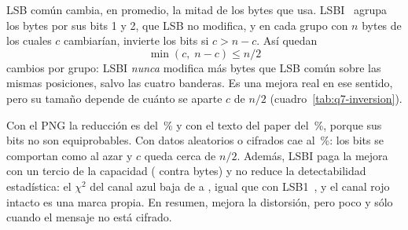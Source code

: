 
LSB común cambia, en promedio, la mitad de los bytes que usa. LSBI~\cite{majeed2015} agrupa los bytes por sus bits 1 y 2, que LSB no modifica, y en cada
grupo con $n$ bytes de los cuales $c$ cambiarían, invierte los bits si $c > n-c$. Así quedan
\[
  \min(c,\; n-c) \le n/2
\]
cambios por grupo: LSBI \emph{nunca} modifica más bytes que LSB común sobre las mismas posiciones, salvo las cuatro banderas. Es una mejora real en ese sentido,
pero su tamaño depende de cuánto se aparte $c$ de $n/2$ (cuadro~\ref{tab:q7-inversion}).

\begin{table}[htbp]
\centering
\footnotesize
\setlength{\tabcolsep}{3pt}
\resizebox{\linewidth}{!}{}
\caption{Bytes modificados sin y con inversión al ocultar cinco cargas en \texttt{lado.bmp} con LSBI}
\label{tab:q7-inversion}
\end{table}

Con el PNG la reducción es del \,\% y con el texto del paper del \,\%, porque sus bits no son equiprobables. Con
datos aleatorios o cifrados cae al \,\%: los bits se comportan como al azar y $c$ queda cerca de $n/2$. Además, LSBI paga la mejora con un
tercio de la capacidad ( contra  bytes) y no reduce la detectabilidad estadística: el $\chi^2$ del canal azul baja de
 a , igual que con LSB1~\cite{westfeld2000}, y el canal rojo intacto es una marca propia. En resumen, mejora la
distorsión, pero poco y sólo cuando el mensaje no está cifrado.
